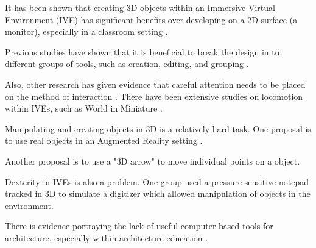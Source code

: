 It has been shown that creating 3D objects within an Immersive Virtual Environment (IVE) has significant benefits over developing on a 2D surface (a monitor)\cite{Kaufmann:Usability}, especially in a classroom setting \cite{Kaufmann:LearningGeometry}.

Previous studies have shown that it is beneficial to break the design in to different groups of tools, such as creation, editing, and grouping
\cite{Butterworth:1992:3DM}.

Also, other research has given evidence that careful attention needs to be placed on the method of interaction \cite{Bowman98interactiontechniques}.
There have been extensive studies on locomotion within IVEs, such as World in Miniature \cite{Pausch:WorldInMiniature}.

Manipulating and creating objects in 3D is a relatively hard task\cite{Mine:MovingObjects}.
One proposal is to use real objects in an Augmented Reality setting
\cite{Jota:2011:CVM:1979742.1979915}.

Another proposal is to use a "3D arrow" to move individual points on a object\cite{5759472}.

Dexterity in IVEs is also a problem.
One group used a pressure sensitive notepad tracked in 3D to simulate a digitizer which allowed manipulation of
objects in the environment\cite{658467}.

There is evidence portraying the lack of useful computer based tools for architecture, especially within architecture education \cite{Dobson:Architecture}.